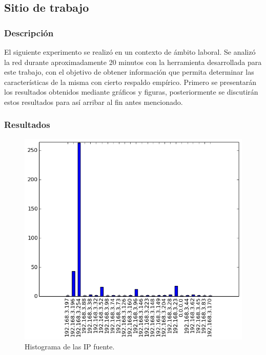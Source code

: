 \subsection{Sitio de trabajo}
\subsubsection{Descripción}
El siguiente experimento se realizó en un contexto de ámbito laboral. Se analizó la red durante aproximadamente 20 minutos con la herramienta desarrollada para este trabajo, con el objetivo de obtener información que permita determinar las características de la misma con cierto respaldo empírico. Primero se presentarán los resultados obtenidos mediante gráficos y figuras, posteriormente se discutirán estos resultados para así arribar al fin antes mencionado.
 
\subsubsection{Resultados}
\begin{figure}[H]
  \centering	
	\includegraphics[scale=0.66]{../experimentacion-agarassino/histogram_src.png}
  \caption{Histograma de las IP fuente.}
	\label{fig:histo-src-sitiotrabajo}
\end{figure}

